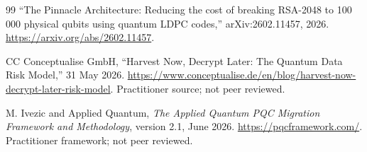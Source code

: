 \documentclass[10pt]{article}
\begin{document}
\begin{thebibliography}{99}
``The Pinnacle Architecture: Reducing the cost of breaking RSA-2048 to 100\,000 physical qubits using quantum LDPC codes,'' arXiv:2602.11457, 2026. \url{https://arxiv.org/abs/2602.11457}.

CC Conceptualise GmbH, ``Harvest Now, Decrypt Later: The Quantum Data Risk Model,'' 31 May 2026. \url{https://www.conceptualise.de/en/blog/harvest-now-decrypt-later-risk-model}. Practitioner source; not peer reviewed.

M. Ivezic and Applied Quantum, \emph{The Applied Quantum PQC Migration Framework and Methodology}, version 2.1, June 2026. \url{https://pqcframework.com/}. Practitioner framework; not peer reviewed.

\end{thebibliography}
\end{document}
